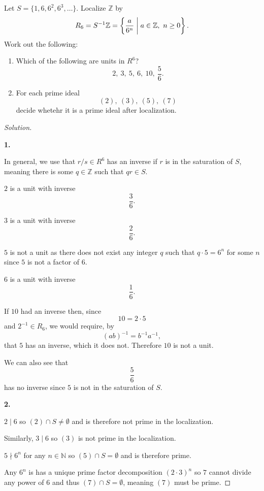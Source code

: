 \documentclass[11pt]{article}
\begin{document}
\begin{prob}
    Let $S = \{1,6,6^2,6^3,\ldots\}$. 
    Localize $\mathbb Z$ by 
    \[
        R_6 = S^{-1}\mathbb Z 
        = \left\{\frac{a}{6^n} \biggm| 
        a \in \mathbb Z, \ n \geq 0\right\}. 
    \]
    Work out the following: 
    \begin{enumerate}
        \item Which of the following are units in 
            $R^6$? 
            \[
            2,\ 3, \ 5, \ 6, \ 10, \ \frac{5}{6}. 
            \]
        \item For each prime ideal 
            \[
                (2), \ (3), \ (5), \ (7) 
            \]
            decide whetehr it is a 
            prime ideal after localization. 
    \end{enumerate}
\end{prob}
\begin{proof}[Solution]
    
    \medskip 
    \ 

    \textbf{1.}

    In general, we use that 
    $r/s \in R^6$ has an inverse if 
    $r$ is in the saturation of $S$, 
    meaning there is some $q \in \mathbb Z$ 
    such that $qr \in S$. 

    $2$ is a unit with inverse 
    \[
        \frac{3}{6}. 
    \]
    
    $3$ is a unit with inverse 
    \[
        \frac{2}6. 
    \]

    $5$ is not a unit as there does 
    not exist any integer $q$ such that 
    $q \cdot 5 = 6^n$ for some $n$ since 
    $5$ is not a factor of $6$. 

    $6$ is a unit with inverse 
    \[
        \frac{1}{6}. 
    \]

    If $10$ had an inverse then, since 
    \[
        10 = 2\cdot 5 
    \]
    and $2^{-1} \in R_6$, we would 
    require, by 
    \[
        (ab)^{-1} = b^{-1}a^{-1}, 
    \]
    that $5$ has an inverse, which it 
    does not. Therefore $10$ is not a 
    unit. 

    We can also see that 
    \[
        \frac56
    \]
    has no inverse since $5$ is not 
    in the saturation of $S$. 

    \textbf{2.}

    $2 \mid 6$ so 
    $(2) \cap S \neq \emptyset$ 
    and is therefore not prime in the 
    localization. 
    
    Similarly, $3 \mid 6$ so 
    $(3)$ is not prime in the localization. 

    $5 \nmid 6^n$ for any $n \in \mathbb N$ 
    so $(5) \cap S = \emptyset$ and 
    is therefore prime. 
    
    Any $6^n$ is has a unique 
    prime factor decomposition 
    $(2\cdot 3)^n$ so $7$ cannot divide 
    any power of $6$ and thus 
    $(7) \cap S = \emptyset$, meaning 
    $(7)$ must be prime. 
\end{proof}
\end{document}
